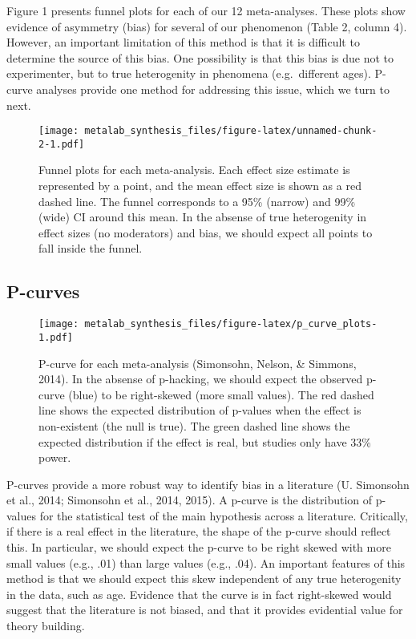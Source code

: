 \documentclass[american,floatsintext,man]{apa6}
\begin{document}
Figure 1 presents funnel plots for each of our 12 meta-analyses. These
plots show evidence of asymmetry (bias) for several of our phenomenon
(Table 2, column 4). However, an important limitation of this method is
that it is difficult to determine the source of this bias. One
possibility is that this bias is due not to experimenter, but to true
heterogenity in phenomena (e.g.~different ages). P-curve analyses
provide one method for addressing this issue, which we turn to next.

\begin{figure}[htbp]
\centering
\texttt{[image: metalab\_synthesis\_files/figure-latex/unnamed-chunk-2-1.pdf]}
\caption{Funnel plots for each meta-analysis. Each effect size estimate
is represented by a point, and the mean effect size is shown as a red
dashed line. The funnel corresponds to a 95\% (narrow) and 99\% (wide)
CI around this mean. In the absense of true heterogenity in effect sizes
(no moderators) and bias, we should expect all points to fall inside the
funnel.}
\end{figure}

\subsection{P-curves}\label{p-curves}

\begin{figure}[htbp]
\centering
\texttt{[image: metalab\_synthesis\_files/figure-latex/p\_curve\_plots-1.pdf]}
\caption{P-curve for each meta-analysis (Simonsohn, Nelson, \& Simmons,
2014). In the absense of p-hacking, we should expect the observed
p-curve (blue) to be right-skewed (more small values). The red dashed
line shows the expected distribution of p-values when the effect is
non-existent (the null is true). The green dashed line shows the
expected distribution if the effect is real, but studies only have 33\%
power.}
\end{figure}

P-curves provide a more robust way to identify bias in a literature (U.
Simonsohn et al., 2014; Simonsohn et al., 2014, 2015). A p-curve is the
distribution of p-values for the statistical test of the main hypothesis
across a literature. Critically, if there is a real effect in the
literature, the shape of the p-curve should reflect this. In particular,
we should expect the p-curve to be right skewed with more small values
(e.g., .01) than large values (e.g., .04). An important features of this
method is that we should expect this skew independent of any true
heterogenity in the data, such as age. Evidence that the curve is in
fact right-skewed would suggest that the literature is not biased, and
that it provides evidential value for theory building.
\end{document}
